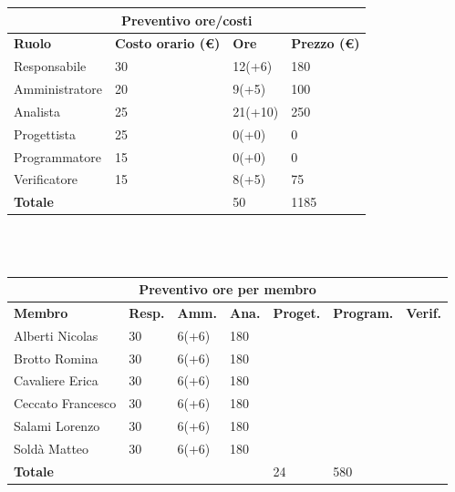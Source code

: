 \documentclass[a4paper, 12pt]{article}
\begin{document}
\begin{center}
	\begin{tabularx}{\textwidth}{|X|X|X|X|}
		\hline
		\multicolumn{4}{|c|}{\textbf{Preventivo ore/costi}}                                      \\
		\hline
		\hline
		\textbf{Ruolo}  & \textbf{Costo orario (\euro)} & \textbf{Ore} & \textbf{Prezzo (\euro)} \\
		\hline
		Responsabile    & 30                            & 12(+6)       & 180                     \\
		\hline
		Amministratore  & 20                            & 9(+5)        & 100                      \\
		\hline
		Analista        & 25                            & 21(+10)       & 250                     \\
		\hline
		Progettista     & 25                            & 0(+0)        & 0                       \\
		\hline
		Programmatore   & 15                            & 0(+0)        & 0                       \\
		\hline
		Verificatore    & 15                            & 8(+5)        & 75                      \\
		\hline
		\hline
		\textbf{Totale} &                               & 50           & 1185                    \\
		\hline
	\end{tabularx}\\[8pt]
	\mbox{}\\
\end{center}


\begin{center}
	\begin{tabularx}{\textwidth}{|X|X|X|X|X|X|X|}
		\hline
		\multicolumn{7}{|c|}{\textbf{Preventivo ore per membro}}                                      \\
		\hline
		\hline
		\textbf{Membro}  & \textbf{Resp.} & \textbf{Amm.} & \textbf{Ana.} &
		\textbf{Proget.} & \textbf{Program.} & \textbf{Verif.} \\
		\hline
		Alberti Nicolas    	& 30 	& 6(+6)       & 180  & &  &                 \\
		\hline
		Brotto Romina    	& 30 	& 6(+6)       & 180  & &  &                 \\
		\hline
		Cavaliere Erica    	& 30 	& 6(+6)       & 180  & &  &                 \\
		\hline
		Ceccato Francesco    	& 30 	& 6(+6)       & 180  & &   &                \\
		\hline
		Salami Lorenzo    	& 30 	& 6(+6)       & 180  & &     &               \\
		\hline
		Soldà Matteo    	& 30 	& 6(+6)       & 180  & &   &                 \\
		\hline
		\hline
		\textbf{Totale} &    & & & 24           & 580      &               \\
		\hline
	\end{tabularx}\\[8pt]
	\mbox{}\\
\end{center}
\end{document}
